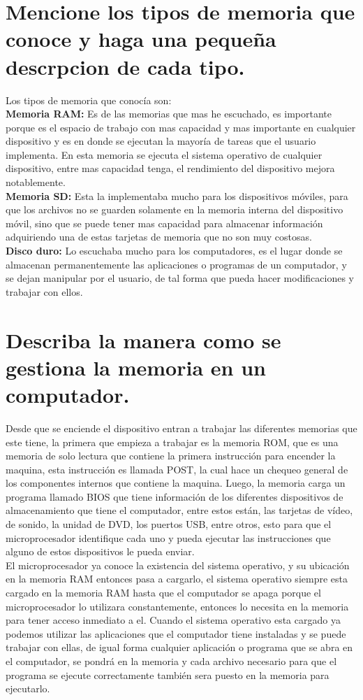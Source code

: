 \documentclass{article}
\begin{document}
\section{Mencione los tipos de memoria que conoce y haga una pequeña descrpcion de cada tipo.} \label{contenido}
        \Large
        Los tipos de memoria que conocía son:\\
       \textbf{Memoria RAM:}
       Es de las memorias que mas he escuchado, es importante porque es el espacio de trabajo con mas capacidad y mas importante en cualquier dispositivo y es en donde se ejecutan la mayoría de tareas que el usuario implementa.
       En esta memoria se ejecuta el sistema operativo de cualquier dispositivo, entre mas capacidad tenga, el rendimiento del dispositivo mejora notablemente.\\
       \textbf{Memoria SD:}
       Esta la implementaba mucho para los dispositivos móviles, para que los archivos no se guarden solamente en la memoria interna del dispositivo móvil, sino que se puede tener mas capacidad para almacenar información adquiriendo una de estas tarjetas de memoria que no son muy costosas.\\
       \textbf{Disco duro:}
       Lo escuchaba mucho para los computadores, es el lugar donde se almacenan permanentemente las aplicaciones o programas de un computador, y se dejan manipular por el usuario, de tal forma que pueda hacer modificaciones y trabajar con ellos.
\section{Describa la manera como se gestiona la memoria en un computador.} \label{contenido}
        \Large
        Desde que se enciende el dispositivo entran a trabajar las diferentes memorias que este tiene, la primera que empieza a trabajar es la memoria ROM, que es una memoria de solo lectura que contiene la primera instrucción para encender la maquina, esta instrucción es llamada POST, la cual hace un chequeo general de los componentes internos que contiene la maquina.
        Luego, la memoria carga un programa llamado BIOS que tiene información de los diferentes dispositivos de almacenamiento que tiene el computador, entre estos están, las tarjetas de vídeo, de sonido, la unidad de DVD, los puertos USB, entre otros, esto para que el microprocesador identifique cada uno y pueda ejecutar las instrucciones que alguno de estos dispositivos le pueda enviar.\\
        El microprocesador ya conoce la existencia del sistema operativo, y su ubicación en la memoria RAM entonces pasa a cargarlo, el sistema operativo siempre esta cargado en la memoria RAM hasta que el computador se apaga porque el microprocesador lo utilizara constantemente, entonces lo necesita en la memoria para tener acceso inmediato a el.
        Cuando el sistema operativo esta cargado ya podemos utilizar las aplicaciones que el computador tiene instaladas y se puede trabajar con ellas, de igual forma cualquier aplicación o programa que se abra en el computador, se pondrá en la memoria y cada archivo necesario para que el programa se ejecute correctamente también sera puesto en la memoria para ejecutarlo.
\end{document}
